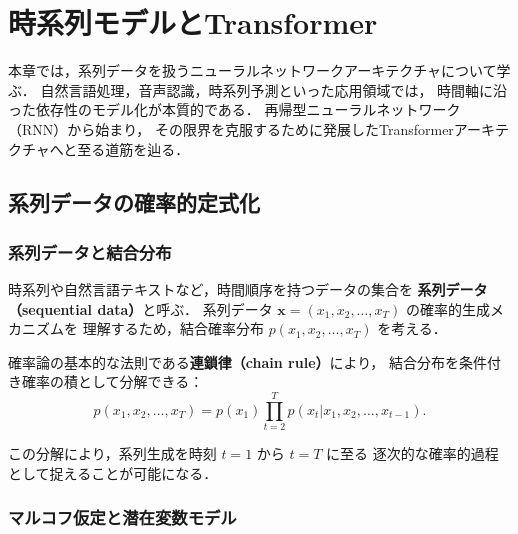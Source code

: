 
\chapter{時系列モデルとTransformer}
\label{chap:transformer}

本章では，系列データを扱うニューラルネットワークアーキテクチャについて学ぶ．
自然言語処理，音声認識，時系列予測といった応用領域では，
時間軸に沿った依存性のモデル化が本質的である．
再帰型ニューラルネットワーク（RNN）から始まり，
その限界を克服するために発展したTransformerアーキテクチャへと至る道筋を辿る．

\section{系列データの確率的定式化}
\label{sec:seq-prob}

\subsection{系列データと結合分布}

時系列や自然言語テキストなど，時間順序を持つデータの集合を
\textbf{系列データ（sequential data）}と呼ぶ．
系列データ $\mathbf{x} = (x_1, x_2, \ldots, x_T)$ の確率的生成メカニズムを
理解するため，結合確率分布 $p(x_1, x_2, \ldots, x_T)$ を考える．

確率論の基本的な法則である\textbf{連鎖律（chain rule）}により，
結合分布を条件付き確率の積として分解できる：
\begin{equation}
  p(x_1, x_2, \ldots, x_T) = p(x_1) \prod_{t=2}^{T} p(x_t | x_1, x_2, \ldots, x_{t-1}).
  \label{eq:chain-rule}
\end{equation}

この分解により，系列生成を時刻 $t=1$ から $t=T$ に至る
逐次的な確率的過程として捉えることが可能になる．

\subsection{マルコフ仮定と潜在変数モデル}


